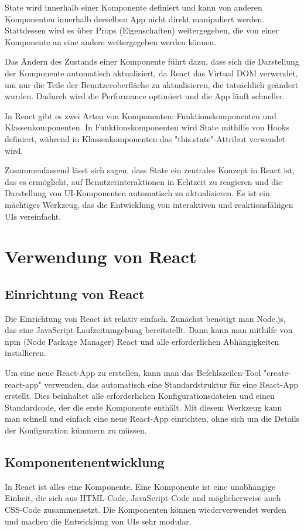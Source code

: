 State wird innerhalb einer Komponente definiert und kann von anderen Komponenten innerhalb derselben App nicht direkt manipuliert werden. Stattdessen wird es über Props (Eigenschaften) weitergegeben, die von einer Komponente an eine andere weitergegeben werden können.

Das Ändern des Zustands einer Komponente führt dazu, dass sich die Darstellung der Komponente automatisch aktualisiert, da React das Virtual DOM verwendet, um nur die Teile der Benutzeroberfläche zu aktualisieren, die tatsächlich geändert wurden. Dadurch wird die Performance optimiert und die App läuft schneller.

In React gibt es zwei Arten von Komponenten: Funktionskomponenten und Klassenkomponenten. In Funktionskomponenten wird State mithilfe von Hooks definiert, während in Klassenkomponenten das "this.state"-Attribut verwendet wird.

Zusammenfassend lässt sich sagen, dass State ein zentrales Konzept in React ist, das es ermöglicht, auf Benutzerinteraktionen in Echtzeit zu reagieren und die Darstellung von UI-Komponenten automatisch zu aktualisieren. Es ist ein mächtiges Werkzeug, das die Entwicklung von interaktiven und reaktionsfähigen UIs vereinfacht.


\section{Verwendung von React}
\subsection{Einrichtung von React}
Die Einrichtung von React ist relativ einfach. Zunächst benötigt man Node.js, das eine JavaScript-Laufzeitumgebung bereitstellt. Dann kann man mithilfe von npm (Node Package Manager) React und alle erforderlichen Abhängigkeiten installieren.

Um eine neue React-App zu erstellen, kann man das Befehlszeilen-Tool "create-react-app" verwenden, das automatisch eine Standardstruktur für eine React-App erstellt. Dies beinhaltet alle erforderlichen Konfigurationsdateien und einen Standardcode, der die erste Komponente enthält. Mit diesem Werkzeug kann man schnell und einfach eine neue React-App einrichten, ohne sich um die Details der Konfiguration kümmern zu müssen.


\subsection{Komponentenentwicklung}
In React ist alles eine Komponente. Eine Komponente ist eine unabhängige Einheit, die sich aus HTML-Code, JavaScript-Code und möglicherweise auch CSS-Code zusammensetzt. Die Komponenten können wiederverwendet werden und machen die Entwicklung von UIs sehr modular.

